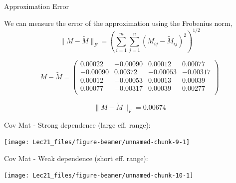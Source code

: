 \documentclass[11pt,ignorenonframetext,]{beamer}
\begin{document}
\begin{frame}{Approximation Error}
\protect\hypertarget{approximation-error}{}

We can measure the error of the approximation using the Frobenius norm,
\[ \lVert M-\tilde M\rVert_F = \left( \sum_{i=1}^m\sum_{j=1}^n (M_{ij}-\tilde M_{ij})^2\right)^{1/2} \]

\pause

\[  M-\tilde M = 
\begin{pmatrix}
  0.00022 & -0.00090 & 0.00012 & 0.00077 \\ 
  -0.00090 & 0.00372 & -0.00053 & -0.00317 \\ 
  0.00012 & -0.00053 & 0.00013 & 0.00039 \\ 
  0.00077 & -0.00317 & 0.00039 & 0.00277 \\ 
\end{pmatrix}
\]

\[ \lVert M-\tilde M\rVert_F = 0.00674 \]

\end{frame}

\begin{frame}{Cov Mat - Strong dependence (large eff. range):}
\protect\hypertarget{cov-mat---strong-dependence-large-eff.-range}{}

\begin{center}\texttt{[image: Lec21\_files/figure-beamer/unnamed-chunk-9-1]} \end{center}

\end{frame}

\begin{frame}{Cov Mat - Weak dependence (short eff. range):}
\protect\hypertarget{cov-mat---weak-dependence-short-eff.-range}{}

\begin{center}\texttt{[image: Lec21\_files/figure-beamer/unnamed-chunk-10-1]} \end{center}

\end{frame}
\end{document}

